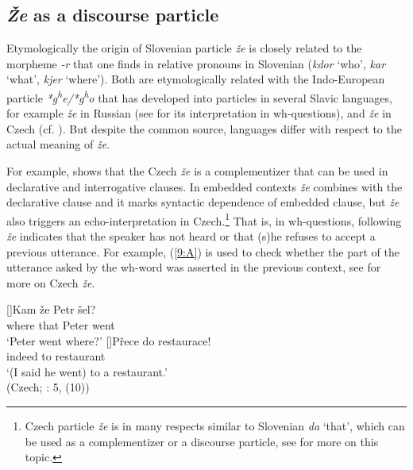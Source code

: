 \documentclass[output=paper,
modfonts,
newtxmath,
hidelinks
]{langscibook}
\begin{document}
\subsection{\textit{Že} as a discourse particle}

Etymologically the origin of Slovenian particle \textit{že} is closely related to the morpheme \textit{-r} that one finds in relative pronouns in Slovenian (\textit{kdor} `who', \textit{kar} `what', \textit{kjer} `where'). Both are etymologically related with the Indo-European particle \textit{*g\textsuperscript{h}e/*g\textsuperscript{h}o} that has developed into particles in several Slavic languages, for example \textit{že} in Russian (see \citealt{hagstrommccoy2003} for its interpretation in wh-questions), and \textit{že} in Czech \citep{skrabalova2012} (cf. \citealt{mitrovic2016benj}). But despite the common source, languages differ with respect to the actual meaning of \textit{že}.\enlargethispage{8pt}

For example, \cite{skrabalova2012} shows that the Czech \textit{že} is a complementizer that can be used in declarative and interrogative clauses. In embedded contexts \textit{že} combines with the declarative clause and it marks syntactic dependence of embedded clause, but \textit{že} also triggers an echo-interpretation in Czech.\footnote{Czech particle \textit{že} is in many respects similar to Slovenian \textit{da} `that', which can be used as a complementizer or a discourse particle, see \cite{marusicetal2015} for more on this topic.} That is, in wh-questions, following \cite{skrabalova2012} \textit{že} indicates that the speaker has not heard or that (s)he refuses to accept a previous utterance. For example, (\ref{9:A}) is used to check whether the part of the utterance asked by the wh-word was asserted in the previous context, see \cite{skrabalova2012} for more on Czech \textit{že}.

\begin{exe} 
\ex\label{9:A}
\begin{xlist}
[]{\gll Kam  že Petr šel?\\
 	 where that Peter went\\
\glt `Peter went where?'}
[]{\gll Přece do restaurace! \\
	 indeed to restaurant \\
\glt `(I said he went) to a restaurant.'\\
\hfill (Czech; \citealt{skrabalova2012}: 5, (10))}
\end{xlist}
\end{exe}
\end{document}
